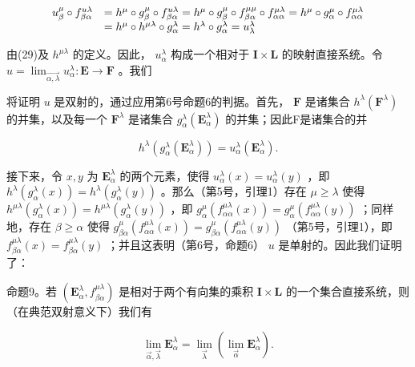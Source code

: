 \[
\begin{array}{r l} u _ {\beta} ^ {\mu} \circ f _ {\beta \alpha} ^ {u \lambda} & = h ^ {\mu} \circ g _ {\beta} ^ {\mu} \circ f _ {\beta \alpha} ^ {u \lambda} = h ^ {\mu} \circ g _ {\beta} ^ {\mu} \circ f _ {\beta \alpha} ^ {\mu \mu} \circ f _ {\alpha \alpha} ^ {\mu \lambda} = h ^ {\mu} \circ g _ {\alpha} ^ {\mu} \circ f _ {\alpha \alpha} ^ {\mu \lambda} \\ & = h ^ {\mu} \circ h ^ {\mu \lambda} \circ g _ {\alpha} ^ {\lambda} = h ^ {\lambda} \circ g _ {\alpha} ^ {\lambda} = u _ {\lambda} ^ {\lambda} \end{array}
\]

由(29)及 \(h^{\mu \lambda}\) 的定义。因此， \(u_{\alpha}^{\lambda}\) 构成一个相对于 \(\mathbf{I} \times \mathbf{L}\) 的映射直接系统。令 \(u = \lim_{\overrightarrow{\alpha, \lambda}} u_{\alpha}^{\lambda}: \mathbf{E} \to \mathbf{F}\) 。我们

将证明 \(u\) 是双射的，通过应用第6号命题6的判据。首先， \(\mathbf{F}\) 是诸集合 \(h^{\lambda}(\mathbf{F}^{\lambda})\) 的并集，以及每一个 \(\mathbf{F}^{\lambda}\) 是诸集合 \(g_{\alpha}^{\lambda}(\mathbf{E}_{\alpha}^{\lambda})\) 的并集；因此F是诸集合的并

\[
h ^ {\lambda} (g _ {\alpha} ^ {\lambda} (\mathbf {E} _ {\alpha} ^ {\lambda})) = u _ {\alpha} ^ {\lambda} (\mathbf {E} _ {\alpha} ^ {\lambda}).
\]

接下来，令 \(x, y\) 为 \(\mathbf{E}_{\alpha}^{\lambda}\) 的两个元素，使得 \(u_{\alpha}^{\lambda}(x) = u_{\alpha}^{\lambda}(y)\) ，即 \(h^{\lambda}(g_{\alpha}^{\lambda}(x)) = h^{\lambda}(g_{\alpha}^{\lambda}(y))\) 。那么（第5号，引理1）存在 \(\mu \geqslant \lambda\) 使得 \(h^{\mu \lambda}(g_{\alpha}^{\lambda}(x)) = h^{\mu \lambda}(g_{\alpha}^{\lambda}(y))\) ，即 \(g_{\alpha}^{\mu}(f_{\alpha \alpha}^{\mu \lambda}(x)) = g_{\alpha}^{\mu}(f_{\alpha \alpha}^{\mu \lambda}(y))\) ；同样地，存在 \(\beta \geqslant \alpha\) 使得 \(g_{\beta \alpha}^{\mu}(f_{\alpha \alpha}^{\mu \lambda}(x)) = g_{\beta \alpha}^{\mu}(f_{\alpha \alpha}^{\mu \lambda}(y))\) （第5号，引理1），即 \(f_{\beta \alpha}^{\mu \lambda}(x) = f_{\beta \alpha}^{\mu \lambda}(y)\) ；并且这表明（第6号，命题6） \(u\) 是单射的。因此我们证明了：

命题9。若 \((\mathbf{E}_{\alpha}^{\lambda}, f_{\beta \alpha}^{\mu \lambda})\) 是相对于两个有向集的乘积 \(\mathbf{I} \times \mathbf{L}\) 的一个集合直接系统，则（在典范双射意义下）我们有

\[
\lim _ {\overrightarrow {\alpha}, \overrightarrow {\lambda}} \mathbf {E} _ {\alpha} ^ {\lambda} = \lim _ {\overrightarrow {\lambda}} (\lim _ {\overrightarrow {\alpha}} \mathbf {E} _ {\alpha} ^ {\lambda}).\tag{32}
\]

